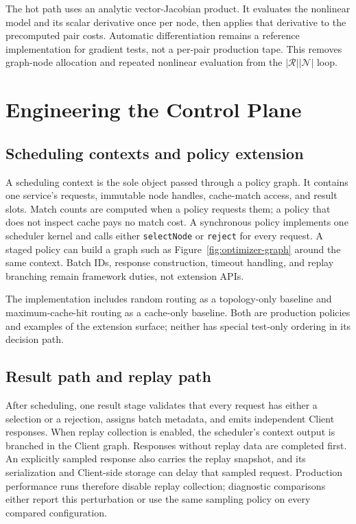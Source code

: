 \documentclass[10pt]{article}
\newcommand{\code}[1]{\texttt{#1}}
\begin{document}
The hot path uses an analytic vector-Jacobian product. It evaluates the
nonlinear model and its scalar derivative once per node, then applies that
derivative to the precomputed pair costs. Automatic differentiation remains a
reference implementation for gradient tests, not a per-pair production tape.
This removes graph-node allocation and repeated nonlinear evaluation from the
$|\mathcal{R}||\mathcal{N}|$ loop.

\section{Engineering the Control Plane}
\label{sec:implementation}

\subsection{Scheduling contexts and policy extension}

A scheduling context is the sole object passed through a policy graph. It
contains one service's requests, immutable node handles, cache-match access,
and result slots. Match counts are computed when a policy requests them; a
policy that does not inspect cache pays no match cost. A synchronous policy
implements one scheduler kernel and calls either \code{selectNode} or
\code{reject} for every request. A staged policy can build a graph such as
Figure~\ref{fig:optimizer-graph} around the same context. Batch IDs, response
construction, timeout handling, and replay branching remain framework duties,
not extension APIs.

The implementation includes random routing as a topology-only baseline and
maximum-cache-hit routing as a cache-only baseline. Both are production
policies and examples of the extension surface; neither has special test-only
ordering in its decision path.

\subsection{Result path and replay path}

After scheduling, one result stage validates that every request has either a
selection or a rejection, assigns batch metadata, and emits independent Client
responses. When replay collection is enabled, the scheduler's context output
is branched in the Client graph. Responses without replay data are completed
first. An explicitly sampled response also carries the replay snapshot, and
its serialization and Client-side storage can delay that sampled request.
Production performance runs therefore disable replay collection; diagnostic
comparisons either report this perturbation or use the same sampling policy on
every compared configuration.
\end{document}
